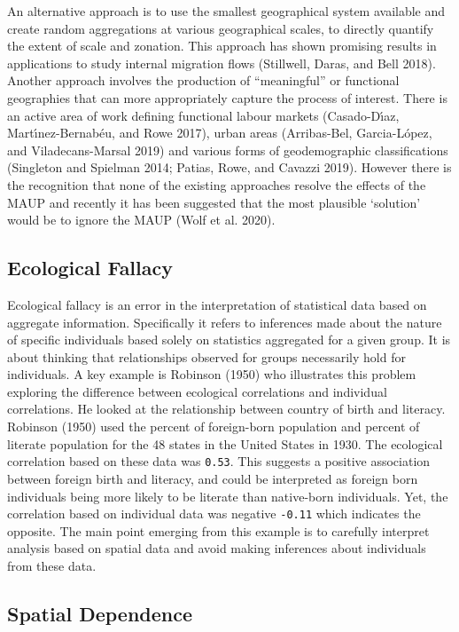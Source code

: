 \documentclass[
  letterpaper,
  DIV=11,
  numbers=noendperiod]{scrreprt}
\begin{document}
An alternative approach is to use the smallest geographical system
available and create random aggregations at various geographical scales,
to directly quantify the extent of scale and zonation. This approach has
shown promising results in applications to study internal migration
flows (Stillwell, Daras, and Bell 2018). Another approach involves the
production of ``meaningful'' or functional geographies that can more
appropriately capture the process of interest. There is an active area
of work defining functional labour markets (Casado-Dı́az,
Martı́nez-Bernabéu, and Rowe 2017), urban areas (Arribas-Bel,
Garcia-López, and Viladecans-Marsal 2019) and various forms of
geodemographic classifications (Singleton and Spielman 2014; Patias,
Rowe, and Cavazzi 2019). However there is the recognition that none of
the existing approaches resolve the effects of the MAUP and recently it
has been suggested that the most plausible `solution' would be to ignore
the MAUP (Wolf et al. 2020).

\hypertarget{ecological-fallacy}{%
\subsection{Ecological Fallacy}\label{ecological-fallacy}}

Ecological fallacy is an error in the interpretation of statistical data
based on aggregate information. Specifically it refers to inferences
made about the nature of specific individuals based solely on statistics
aggregated for a given group. It is about thinking that relationships
observed for groups necessarily hold for individuals. A key example is
Robinson (1950) who illustrates this problem exploring the difference
between ecological correlations and individual correlations. He looked
at the relationship between country of birth and literacy. Robinson
(1950) used the percent of foreign-born population and percent of
literate population for the 48 states in the United States in 1930. The
ecological correlation based on these data was \texttt{0.53}. This
suggests a positive association between foreign birth and literacy, and
could be interpreted as foreign born individuals being more likely to be
literate than native-born individuals. Yet, the correlation based on
individual data was negative \texttt{-0.11} which indicates the
opposite. The main point emerging from this example is to carefully
interpret analysis based on spatial data and avoid making inferences
about individuals from these data.

\hypertarget{spatial-dependence}{%
\subsection{Spatial Dependence}\label{spatial-dependence}}
\end{document}

